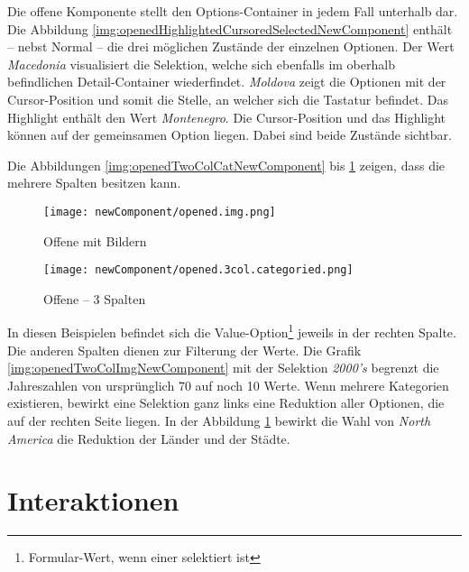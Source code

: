 Die offene Komponente stellt den Options-Container in jedem Fall unterhalb dar. 
Die Abbildung \ref{img:openedHighlightedCursoredSelectedNewComponent} enthält – nebst Normal – die drei möglichen Zustände der einzelnen Optionen. 
Der Wert \emph{Macedonia} visualisiert die Selektion, welche sich ebenfalls im oberhalb befindlichen Detail-Container wiederfindet. 
\emph{Moldova} zeigt die Optionen mit der Cursor-Position und somit die Stelle, an welcher sich die Tastatur befindet. 
Das Highlight enthält den Wert \emph{Montenegro}. 
Die Cursor-Position und das Highlight können auf der gemeinsamen Option liegen. 
Dabei sind beide Zustände sichtbar. 

Die Abbildungen \ref{img:openedTwoColCatNewComponent} bis \ref{img:openedThreeColCatNewComponent} zeigen, dass die  mehrere Spalten besitzen kann. 

\begin{figure}[!htb]
    \begin{minipage}[b]{0.43\textwidth}
        \centering
        \texttt{[image: newComponent/opened.img.png]}
        \caption{\centering Offene  mit Bildern}
        \label{img:openedTwoColImgNewComponent}
    \end{minipage}
    \hfill
    \begin{minipage}[b]{0.47\textwidth}
        \centering
        \texttt{[image: newComponent/opened.3col.categoried.png]}
        \caption{\centering Offene  – 3 Spalten}
        \label{img:openedThreeColCatNewComponent}
    \end{minipage}
\end{figure}

In diesen Beispielen befindet sich die Value-Option\footnote{
    Formular-Wert, wenn einer selektiert ist
} jeweils in der rechten Spalte. 
Die anderen Spalten dienen zur Filterung der Werte. 
Die Grafik \ref{img:openedTwoColImgNewComponent} mit der Selektion \emph{2000's} begrenzt die Jahreszahlen von ursprünglich 70 auf noch 10 Werte. 
Wenn mehrere Kategorien existieren, bewirkt eine Selektion ganz links eine Reduktion aller Optionen, die auf der rechten Seite liegen. 
In der Abbildung \ref{img:openedThreeColCatNewComponent} bewirkt die Wahl von \emph{North America} die Reduktion der Länder und der Städte. 


\section{Interaktionen}
\label{sec:interaction}

